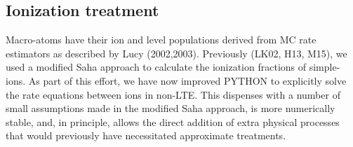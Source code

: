 \documentclass[useAMS,usenatbib]{mn2e_x}
\begin{document}
\subsection{Ionization treatment}

Macro-atoms have their ion and level populations derived from
MC rate estimators as described by Lucy (2002,2003). 
Previously (LK02, H13, M15), we used a modified Saha approach to calculate the ionization fractions
of simple-ions. As part of  this effort, we have now improved {\sc PYTHON} to explicitly solve the 
rate equations between ions in non-LTE. This dispenses with a number of small assumptions 
made in the modified Saha approach, is more numerically stable, and, in principle, allows 
the direct addition of extra physical processes that would previously have necessitated 
approximate treatments.
\end{document}
